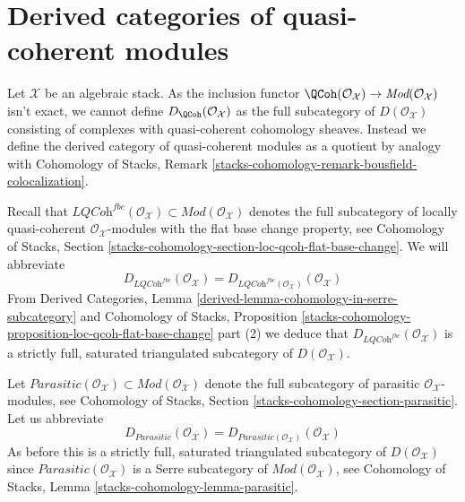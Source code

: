





\section{Derived categories of quasi-coherent modules}
\label{section-derived}

\noindent
Let $\mathcal{X}$ be an algebraic stack. As the inclusion functor
$\QCoh(\mathcal{O}_\mathcal{X}) \to
\textit{Mod}(\mathcal{O}_\mathcal{X})$ isn't exact, we cannot define
$D_\QCoh(\mathcal{O}_\mathcal{X})$ as the full subcategory
of $D(\mathcal{O}_\mathcal{X})$ consisting of complexes with quasi-coherent
cohomology sheaves. Instead we define the derived category of
quasi-coherent modules as a quotient
by analogy with Cohomology of Stacks, Remark
\ref{stacks-cohomology-remark-bousfield-colocalization}.

\medskip\noindent
Recall that $\textit{LQCoh}^{fbc}(\mathcal{O}_\mathcal{X}) \subset
\textit{Mod}(\mathcal{O}_\mathcal{X})$ denotes the full subcategory
of locally quasi-coherent $\mathcal{O}_\mathcal{X}$-modules with the
flat base change property, see Cohomology of Stacks, Section
\ref{stacks-cohomology-section-loc-qcoh-flat-base-change}.
We will abbreviate
$$
D_{\textit{LQCoh}^{fbc}}(\mathcal{O}_\mathcal{X}) =
D_{\textit{LQCoh}^{fbc}(\mathcal{O}_\mathcal{X})}(\mathcal{O}_\mathcal{X})
$$
From
Derived Categories, Lemma \ref{derived-lemma-cohomology-in-serre-subcategory}
and Cohomology of Stacks, Proposition
\ref{stacks-cohomology-proposition-loc-qcoh-flat-base-change} part (2)
we deduce that $D_{\textit{LQCoh}^{fbc}}(\mathcal{O}_\mathcal{X})$
is a strictly full, saturated triangulated subcategory of
$D(\mathcal{O}_\mathcal{X})$.

\medskip\noindent
Let $\textit{Parasitic}(\mathcal{O}_\mathcal{X}) \subset
\textit{Mod}(\mathcal{O}_\mathcal{X})$ denote the full subcategory
of parasitic $\mathcal{O}_\mathcal{X}$-modules, see
Cohomology of Stacks, Section
\ref{stacks-cohomology-section-parasitic}.
Let us abbreviate
$$
D_{\textit{Parasitic}}(\mathcal{O}_\mathcal{X}) =
D_{\textit{Parasitic}(\mathcal{O}_\mathcal{X})}(\mathcal{O}_\mathcal{X})
$$
As before this is a strictly full, saturated triangulated subcategory of
$D(\mathcal{O}_\mathcal{X})$ since
$\textit{Parasitic}(\mathcal{O}_\mathcal{X})$
is a Serre subcategory of $\textit{Mod}(\mathcal{O}_\mathcal{X})$, see
Cohomology of Stacks, Lemma \ref{stacks-cohomology-lemma-parasitic}.


